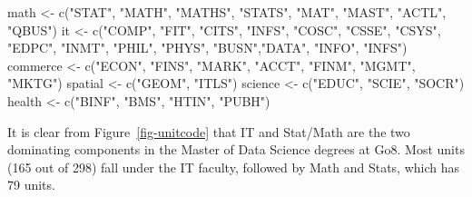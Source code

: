 \documentclass[
  letterpaper,
]{report}
\newenvironment{Shaded}{\begin{snugshade}}{\end{snugshade}}
\newcommand{\FunctionTok}[1]{\textcolor[rgb]{0.28,0.35,0.67}{#1}}
\newcommand{\NormalTok}[1]{\textcolor[rgb]{0.00,0.23,0.31}{#1}}
\newcommand{\OtherTok}[1]{\textcolor[rgb]{0.00,0.23,0.31}{#1}}
\newcommand{\StringTok}[1]{\textcolor[rgb]{0.13,0.47,0.30}{#1}}
\begin{document}
\begin{Shaded}
\begin{Highlighting}[]
\NormalTok{math }\OtherTok{\textless{}{-}} \FunctionTok{c}\NormalTok{(}\StringTok{"STAT"}\NormalTok{, }\StringTok{"MATH"}\NormalTok{, }\StringTok{"MATHS"}\NormalTok{, }\StringTok{"STATS"}\NormalTok{, }\StringTok{"MAT"}\NormalTok{, }\StringTok{"MAST"}\NormalTok{, }\StringTok{"ACTL"}\NormalTok{, }\StringTok{"QBUS"}\NormalTok{)}
\NormalTok{it }\OtherTok{\textless{}{-}} \FunctionTok{c}\NormalTok{(}\StringTok{"COMP"}\NormalTok{, }\StringTok{"FIT"}\NormalTok{, }\StringTok{"CITS"}\NormalTok{, }\StringTok{"INFS"}\NormalTok{, }\StringTok{"COSC"}\NormalTok{, }\StringTok{"CSSE"}\NormalTok{, }\StringTok{"CSYS"}\NormalTok{, }\StringTok{"EDPC"}\NormalTok{, }\StringTok{"INMT"}\NormalTok{, }\StringTok{"PHIL"}\NormalTok{, }\StringTok{"PHYS"}\NormalTok{, }\StringTok{"BUSN"}\NormalTok{,}\StringTok{"DATA"}\NormalTok{, }\StringTok{"INFO"}\NormalTok{, }\StringTok{"INFS"}\NormalTok{)}
\NormalTok{commerce }\OtherTok{\textless{}{-}} \FunctionTok{c}\NormalTok{(}\StringTok{"ECON"}\NormalTok{, }\StringTok{"FINS"}\NormalTok{, }\StringTok{"MARK"}\NormalTok{, }\StringTok{"ACCT"}\NormalTok{, }\StringTok{"FINM"}\NormalTok{, }\StringTok{"MGMT"}\NormalTok{, }\StringTok{"MKTG"}\NormalTok{)}
\NormalTok{spatial }\OtherTok{\textless{}{-}} \FunctionTok{c}\NormalTok{(}\StringTok{"GEOM"}\NormalTok{, }\StringTok{"ITLS"}\NormalTok{)}
\NormalTok{science }\OtherTok{\textless{}{-}} \FunctionTok{c}\NormalTok{(}\StringTok{"EDUC"}\NormalTok{, }\StringTok{"SCIE"}\NormalTok{, }\StringTok{"SOCR"}\NormalTok{)}
\NormalTok{health }\OtherTok{\textless{}{-}} \FunctionTok{c}\NormalTok{(}\StringTok{"BINF"}\NormalTok{, }\StringTok{"BMS"}\NormalTok{, }\StringTok{"HTIN"}\NormalTok{, }\StringTok{"PUBH"}\NormalTok{)}
\end{Highlighting}
\end{Shaded}

It is clear from Figure~\ref{fig-unitcode} that IT and Stat/Math are the
two dominating components in the Master of Data Science degrees at Go8.
Most units (165 out of 298) fall under the IT faculty, followed by Math
and Stats, which has 79 units.
\end{document}
